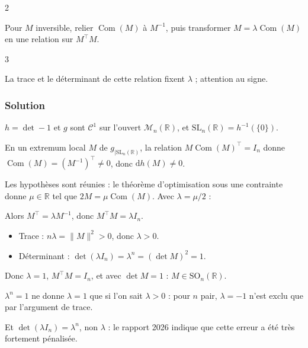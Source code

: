 \documentclass[11pt,a4paper]{article}
\providecommand{\tightlist}{\setlength{\itemsep}{0pt}\setlength{\parskip}{0pt}}
\newcommand{\equationajustee}[1]{%
  \sbox{\boiteequation}{$\displaystyle #1$}%
  \ifdim\wd\boiteequation>\linewidth
    \[\resizebox{\linewidth}{!}{\usebox{\boiteequation}}\]%
  \else
    \[#1\]%
  \fi}
\begin{document}
\begin{indication}{2}

Pour \(M\) inversible, relier \(\operatorname{Com}(M)\) à \(M^{-1}\), puis transformer \(M=\lambda\operatorname{Com}(M)\) en une relation sur \(M^\top M\).

\end{indication}

\begin{indication}{3}

La trace et le déterminant de cette relation fixent \(\lambda\) ; attention au signe.

\end{indication}

\hypertarget{solution-15}{%
\subsubsection{Solution}\label{solution-15}}

\(h=\det-1\) et \(g\) sont \({\mathcal{C}}^1\) sur l'ouvert \({\mathcal{M}}_n(\mathbb{R})\), et \({\mathrm{SL}}_n(\mathbb{R})=h^{-1}(\{0\})\).

En un extremum local \(M\) de \(g_{|{\mathrm{SL}}_n(\mathbb{R})}\), la relation \(M\operatorname{Com}(M)^\top=I_n\) donne \(\operatorname{Com}(M)=(M^{-1})^\top\neq0\), donc \(\mathrm{d}h(M)\neq0\).

Les hypothèses sont réunies : le théorème d'optimisation sous une contrainte donne \(\mu\in\mathbb{R}\) tel que \(2M=\mu\operatorname{Com}(M)\). Avec \(\lambda=\mu/2\) :

\equationajustee{\boxed{M=\lambda\operatorname{Com}(M),\ \lambda\in\mathbb{R}.}}

Alors \(M^\top=\lambda M^{-1}\), donc \(M^\top M=\lambda I_n\).

\begin{itemize}
\tightlist
\item
  Trace : \(n\lambda=\|M\|^2>0\), donc \(\lambda>0\).
\item
  Déterminant : \(\det(\lambda I_n)=\lambda^n=(\det M)^2=1\).
\end{itemize}

Donc \(\lambda=1\), \(M^\top M=I_n\), et avec \(\det M=1\) : \textbf{\(M\in{\mathrm{SO}}_n(\mathbb{R})\)}.

\begin{piege}

\(\lambda^n=1\) ne donne \(\lambda=1\) que si l'on sait \(\lambda>0\) : pour \(n\) pair, \(\lambda=-1\) n'est exclu que par l'argument de trace.

Et \(\det(\lambda I_n)=\lambda^n\), non \(\lambda\) : le rapport 2026 indique que cette erreur a été très fortement pénalisée.

\end{piege}
\end{document}
